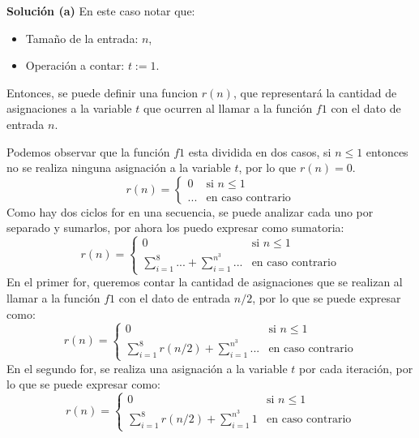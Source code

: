 \textbf{Solución (a)}
En este caso notar que:
\begin{itemize}
    \item Tamaño de la entrada: $n$,
    \item Operación a contar: $t := 1$.
\end{itemize}
Entonces, se puede definir una funcion $r(n)$, que representará la cantidad de asignaciones a la variable $t$ que ocurren al llamar a la función $f1$ con el dato de entrada $n$.

Podemos observar que la función $f1$ esta dividida en dos casos, si $n \leq 1$ entonces no se realiza ninguna asignación a la variable $t$, por lo que $r(n) = 0$.
\begin{equation*}
    r(n) = 
    \begin{cases}
        0 & \text{si } n \leq 1 \\
        ... & \text{en caso contrario}
    \end{cases}
\end{equation*}
Como hay dos ciclos for en una secuencia, se puede analizar cada uno por separado y sumarlos, por ahora los puedo expresar como sumatoria:
\begin{equation*}
    r(n) = 
    \begin{cases}
        0 & \text{si } n \leq 1 \\
        \sum_{i=1}^{8} ... + \sum_{i=1}^{n^3} ... & \text{en caso contrario}
    \end{cases}
\end{equation*}
En el primer for, queremos contar la cantidad de asignaciones que se realizan al llamar a la función $f1$ con el dato de entrada $n/2$, por lo que se puede expresar como:
\begin{equation*}
    r(n) = 
    \begin{cases}
        0 & \text{si } n \leq 1 \\
        \sum_{i=1}^{8} r(n/2) + \sum_{i=1}^{n^3} ... & \text{en caso contrario}
    \end{cases}
\end{equation*}
En el segundo for, se realiza una asignación a la variable $t$ por cada iteración, por lo que se puede expresar como:
\begin{equation*}
    r(n) = 
    \begin{cases}
        0 & \text{si } n \leq 1 \\
        \sum_{i=1}^{8} r(n/2) + \sum_{i=1}^{n^3} 1 & \text{en caso contrario}
    \end{cases}
\end{equation*}

